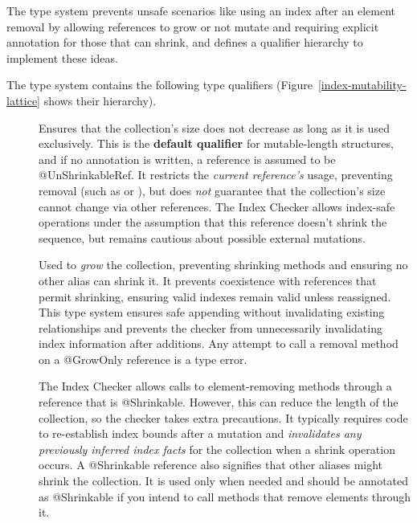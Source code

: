 The type system prevents unsafe scenarios like using an index after an element removal
by allowing references to grow or not mutate and requiring explicit annotation for those
that can shrink, and defines a qualifier hierarchy to implement these ideas.


The type system contains the following type qualifiers
(Figure~\ref{index-mutability-lattice} shows their hierarchy).

\begin{description}
\item[]
  Ensures that the collection's size does not decrease as long as it is used exclusively.
  This is the \textbf{default qualifier} for mutable-length structures, and if no annotation is
  written, a reference is assumed to be @UnShrinkableRef. It restricts the \emph{current reference’s}
  usage, preventing removal (such as  or ), but does \emph{not} guarantee
  that the collection's size cannot change via other references. The Index Checker allows index-safe
  operations under the assumption that this reference doesn't shrink the sequence, but remains cautious
  about possible external mutations.

\item[]
  Used to \emph{grow} the collection, preventing shrinking methods and ensuring no other alias
  can shrink it. It prevents coexistence with references that permit shrinking, ensuring valid
  indexes remain valid unless reassigned. This type system ensures safe appending without
  invalidating existing relationships and prevents the checker from unnecessarily
  invalidating index information after additions. Any attempt to call a removal method on a
  @GrowOnly reference is a type error.

\item[]
  The Index Checker allows calls to element-removing methods through a reference that is @Shrinkable.
  However, this can reduce the length of the collection, so the checker takes extra precautions.
  It typically requires code to re-establish index bounds after a mutation and
  \emph{invalidates any previously inferred index facts} for the collection when a shrink operation occurs.
  A @Shrinkable reference also signifies that other aliases might shrink the collection.
  It is used only when needed and should be annotated as @Shrinkable if you intend to call methods that
  remove elements through it.


\end{description}
